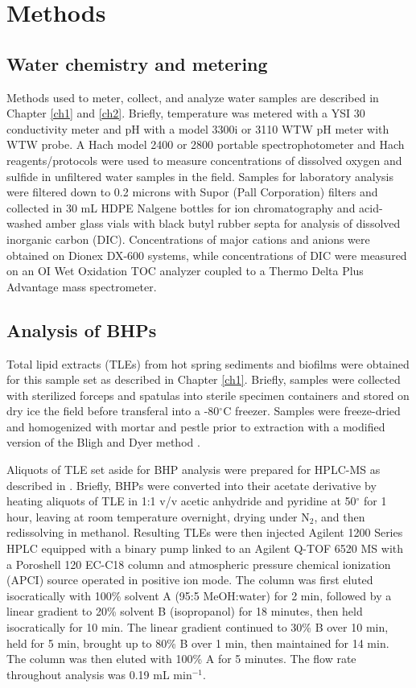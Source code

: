 \citep{need a ref}


\section{Methods}

\subsection{Water chemistry and metering}
Methods used to meter, collect, and analyze water samples are described in Chapter \ref{ch1} and \ref{ch2}. Briefly, temperature was metered with a YSI 30 conductivity meter and pH with a model 3300i or 3110 WTW pH meter with WTW probe. A Hach model 2400 or 2800 portable spectrophotometer and Hach reagents/protocols were used to measure concentrations of dissolved oxygen and sulfide in unfiltered water samples in the field. Samples for laboratory analysis were filtered down to 0.2 microns with Supor (Pall Corporation) filters and collected in 30 mL HDPE Nalgene bottles for ion chromatography and acid-washed amber glass vials with black butyl rubber septa for analysis of dissolved inorganic carbon (DIC). Concentrations of major cations and anions were obtained on Dionex DX-600 systems, while concentrations of DIC were measured on an OI Wet Oxidation TOC analyzer coupled to a Thermo Delta Plus Advantage mass spectrometer.

\subsection{Analysis of BHPs} Total lipid extracts (TLEs) from hot spring sediments and biofilms were obtained for this sample set as described in Chapter \ref{ch1}. Briefly, samples were collected with sterilized forceps and spatulas into sterile specimen containers and stored on dry ice the field before transferal into a -80$^{\circ}$C freezer. Samples were freeze-dried and homogenized with mortar and pestle prior to extraction with a modified version of the Bligh and Dyer method \citep{white1998signature}.

Aliquots of TLE set aside for BHP analysis were prepared for HPLC-MS as described in \cite{talbot2003atmospheric}. Briefly, BHPs were converted into their acetate derivative by heating aliquots of TLE in 1:1 v/v acetic anhydride and pyridine at 50$^{\circ}$ for 1 hour, leaving at room temperature overnight, drying under N$_2$, and then redissolving in methanol. Resulting TLEs were then injected Agilent 1200 Series HPLC equipped with a binary pump linked to an Agilent Q-TOF 6520 MS with a Poroshell 120 EC-C18 column and atmospheric pressure chemical ionization (APCI) source operated in positive ion mode. The column was first eluted isocratically with 100\% solvent A (95:5 MeOH:water) for 2 min, followed by a linear gradient to 20\% solvent B (isopropanol) for 18 minutes, then held isocratically for 10 min. The linear gradient continued to 30\% B over 10 min, held for 5 min, brought up to 80\% B over 1 min, then maintained for 14 min. The column was then eluted with 100\% A for 5 minutes. The flow rate throughout analysis was 0.19 mL min$^{-1}$.

